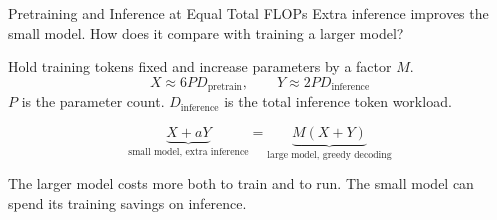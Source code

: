 \documentclass[aspectratio=1610,xcolor=dvipsnames,t]{beamer}
\begin{document}
\begin{frame}{Pretraining and Inference at Equal Total FLOPs}
  Extra inference improves the small model. How does it compare with training a larger model?
  \par\smallskip
  Hold training tokens fixed and increase parameters by a factor $M$.
  \[
    X\approx6PD_{\mathrm{pretrain}},\qquad
    Y\approx2PD_{\mathrm{inference}}
  \]
  $P$ is the parameter count. $D_{\mathrm{inference}}$ is the total inference token workload.
  \par\medskip
  \[
    \underbrace{X+aY}_{\text{small model, extra inference}}
    =\underbrace{M(X+Y)}_{\text{large model, greedy decoding}}
  \]
  \par\medskip
  The larger model costs more both to train and to run. The small model can spend its training savings on inference.
\end{frame}
\end{document}
